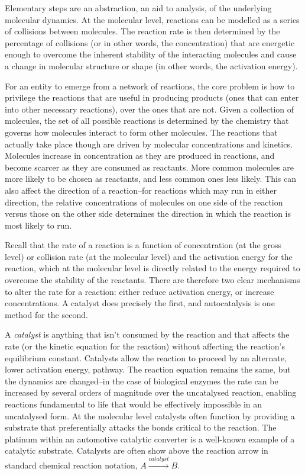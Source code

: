Elementary steps are an abstraction, an aid to analysis, of the underlying molecular dynamics. At the molecular level, reactions can be
modelled as a series of collisions between molecules. The reaction rate is then determined by the percentage of collisions (or in other words,
the concentration) that are energetic enough to overcome the inherent stability of the interacting molecules and cause a change in molecular
structure or shape (in other words, the activation energy).

For an entity to emerge from a network of reactions, the core problem is how to privilege the reactions that are useful in producing products (ones that can enter into other necessary reactions), over the ones that are not. Given a collection of molecules, the set of all possible reactions is determined by the chemistry that governs how molecules interact to form other molecules. The reactions that actually take place though are driven by molecular concentrations and kinetics. Molecules increase in concentration as they are produced in reactions, and become scarcer as they are consumed as reactants. More common molecules are more likely to be chosen as reactants, and less common ones less likely. This can also affect the direction of a reaction--for reactions which may run in either direction, the relative concentrations of molecules on one side of the reaction versus those on the other side determines the direction in which the reaction is most likely to run.

Recall that the rate of a reaction is a function of concentration (at the gross level) or collision rate (at the molecular level) and the
activation energy for the reaction, which at the molecular level is directly related to the energy required to overcome the stability of the
reactants. There are therefore two clear mechanisms to alter the rate for a reaction: either reduce activation energy, or increase
concentrations. A catalyst does precisely the first, and autocatalysis is one method for the second.

A \emph{catalyst} is anything that isn't consumed by the reaction and that affects the rate (or the kinetic equation for the reaction) without
affecting the reaction's equilibrium constant. Catalysts allow the reaction to proceed by an alternate, lower activation energy, pathway.
The reaction equation remains the same, but the dynamics are changed--in the case of biological enzymes the rate can be increased by several
orders of magnitude over the uncatalysed reaction, enabling reactions fundamental to life that would be effectively impossible in an
uncatalysed form. At the molecular level catalysts often function by providing a substrate that preferentially attacks the bonds critical to
the reaction. The platinum within an automotive catalytic converter is a well-known example of a catalytic substrate. Catalysts are often show above the reaction arrow in standard chemical reaction notation, \eg$A\xrightarrow{catalyst} B$.

